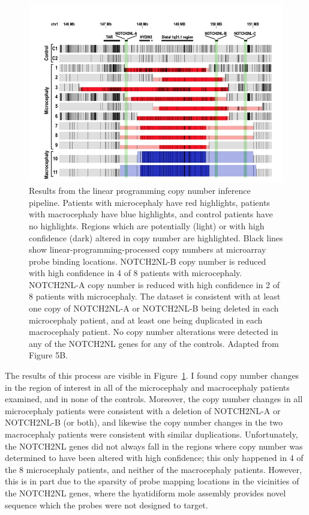 \documentclass[11pt,proposal]{ucthesis}
\begin{document}
\begin{figure}[h!t]
    \centering
    \includegraphics[width=1.0\textwidth]{figures/notch2nl.png}
    \caption[Results from the linear programming copy number inference pipeline]{Results from the linear programming copy number inference pipeline. Patients with microcephaly have red highlights, patients with macrocephaly have blue highlights, and control patients have no highlights. Regions which are potentially (light) or with high confidence (dark) altered in copy number are highlighted. Black lines show linear-programming-processed copy numbers at microarray probe binding locations. NOTCH2NL-B copy number is reduced with high confidence in 4 of 8 patients with microcephaly. NOTCH2NL-A copy number is reduced with high confidence in 2 of 8 patients with microcephaly. The dataset is consistent with at least one copy of NOTCH2NL-A or NOTCH2NL-B being deleted in each microcephaly patient, and at least one being duplicated in each macrocephaly patient. No copy number alterations were detected in any of the NOTCH2NL genes for any of the controls. Adapted from \cite{jacobs2014recently} Figure 5B.}
    \label{fig:notch2nl}
\end{figure}

The results of this process are visible in Figure~\ref{fig:notch2nl}. I found copy number changes in the region of interest in all of the microcephaly and macrocephaly patients examined, and in none of the controls. Moreover, the copy number changes in all microcephaly patients were consistent with a deletion of NOTCH2NL-A or NOTCH2NL-B (or both), and likewise the copy number changes in the two macrocephaly patients were consistent with similar duplications. Unfortunately, the NOTCH2NL genes did not always fall in the regions where copy number was determined to have been altered with high confidence; this only happened in 4 of the 8 microcephaly patients, and neither of the macrocephaly patients. However, this is in part due to the sparsity of probe mapping locations in the vicinities of the NOTCH2NL genes, where the hyatidiform mole assembly provides novel sequence which the probes were not designed to target.
\end{document}
